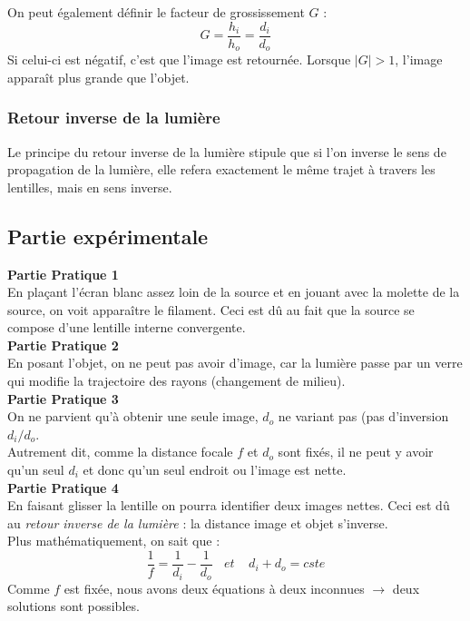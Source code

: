 \documentclass	[11pt, a4paper, openany]{book}
\begin{document}
On peut également définir le facteur de grossissement $G$ :
\begin{equation}
G = \frac{h_i}{h_o} = \frac{d_i}{d_o}
\end{equation}
Si celui-ci est négatif, c'est que l'image est retournée. Lorsque $|G| > 1$, l'image apparaît plus grande que l'objet.

\subsubsection*{Retour inverse de la lumière}
Le principe du retour inverse de la lumière stipule que si l'on inverse le sens de propagation de la lumière, elle refera exactement le même trajet à travers les lentilles, mais en sens inverse.

\newpage
\subsection{Partie expérimentale}
\textbf{Partie Pratique 1}\\
En plaçant l'écran blanc assez loin de la source et en jouant avec la molette de la source, on voit apparaître le filament. Ceci est dû au fait que la source se compose d'une lentille interne convergente.\\

\textbf{Partie Pratique 2}\\
En posant l'objet, on ne peut pas avoir d'image, car la lumière passe par un verre qui modifie la trajectoire des rayons (changement de milieu).\\

\textbf{Partie Pratique 3}\\
On ne parvient qu'à obtenir une seule image, $d_o$ ne variant pas (pas d'inversion $d_i/d_o$.\\
Autrement dit, comme la distance focale $f$ et $d_o$ sont fixés, il ne peut y avoir qu'un seul $d_i$ et donc qu'un seul endroit ou l'image est nette.\\

\textbf{Partie Pratique 4}\\
En faisant glisser la lentille on pourra identifier deux images nettes. Ceci est dû au \textit{retour inverse de la lumière} : la distance image et objet s'inverse.\\
Plus mathématiquement, on sait que :
\begin{equation}
\frac{1}{f} = \frac{1}{d_i} - \frac{1}{d_o}\ \ \ \ et\ \ \ \ \ d_i + d_o = cste
\end{equation}
Comme $f$ est fixée, nous avons deux équations à deux inconnues $\rightarrow$ deux solutions sont possibles.\\
\end{document}
